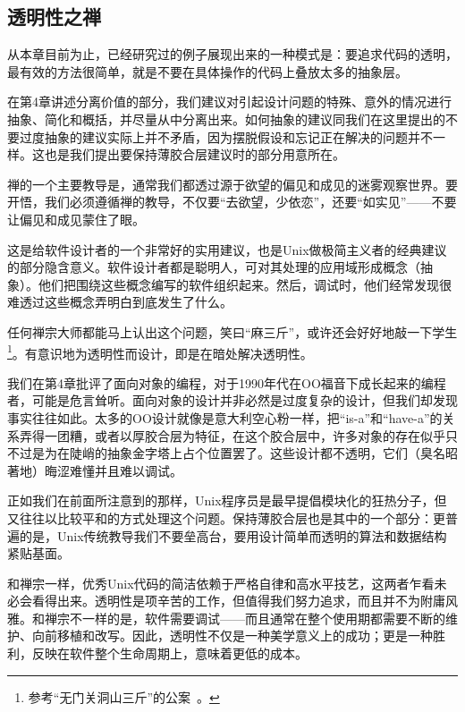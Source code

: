 \documentclass[12pt,oneside]{ctexbook}
\begin{document}
\begin{common-format}
\subsection{透明性之禅}
从本章目前为止，已经研究过的例子展现出来的一种模式是：要追求代码的透明，最有效的方法很简单，就是不要在具体操作的代码上叠放太多的抽象层。

在第4章讲述分离价值的部分，我们建议对引起设计问题的特殊、意外的情况进行抽象、简化和概括，并尽量从中分离出来。如何抽象的建议同我们在这里提出的不要过度抽象的建议实际上并不矛盾，因为摆脱假设和忘记正在解决的问题并不一样。这也是我们提出要保持薄胶合层建议时的部分用意所在。

禅的一个主要教导是，通常我们都透过源于欲望的偏见和成见的迷雾观察世界。要开悟，我们必须遵循禅的教导，不仅要“去欲望，少依恋”，还要“如实见”——不要让偏见和成见蒙住了眼。

这是给软件设计者的一个非常好的实用建议，也是Unix做极简主义者的经典建议的部分隐含意义。软件设计者都是聪明人，可对其处理的应用域形成概念（抽象）。他们把围绕这些概念编写的软件组织起来。然后，调试时，他们经常发现很难透过这些概念弄明白到底发生了什么。

任何禅宗大师都能马上认出这个问题，笑曰“麻三斤”，或许还会好好地敲一下学生\footnote{参考“无门关洞山三斤”的公案~\cite{Mumon}。}。有意识地为透明性而设计，即是在暗处解决透明性。

我们在第4章批评了面向对象的编程，对于1990年代在OO福音下成长起来的编程者，可能是危言耸听。面向对象的设计并非必然是过度复杂的设计，但我们却发现事实往往如此。太多的OO设计就像是意大利空心粉一样，把“is-a”和“have-a”的关系弄得一团糟，或者以厚胶合层为特征，在这个胶合层中，许多对象的存在似乎只不过是为在陡峭的抽象金字塔上占个位置罢了。这些设计都不透明，它们（臭名昭著地）晦涩难懂并且难以调试。

正如我们在前面所注意到的那样，Unix程序员是最早提倡模块化的狂热分子，但又往往以比较平和的方式处理这个问题。保持薄胶合层也是其中的一个部分：更普遍的是，Unix传统教导我们不要垒高台，要用设计简单而透明的算法和数据结构紧贴基面。

和禅宗一样，优秀Unix代码的简洁依赖于严格自律和高水平技艺，这两者乍看未必会看得出来。透明性是项辛苦的工作，但值得我们努力追求，而且并不为附庸风雅。和禅宗不一样的是，软件需要调试——而且通常在整个使用期都需要不断的维护、向前移植和改写。因此，透明性不仅是一种美学意义上的成功；更是一种胜利，反映在软件整个生命周期上，意味着更低的成本。



\end{common-format}
\end{document}
